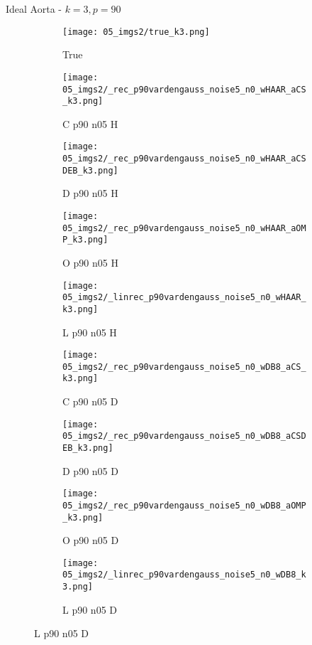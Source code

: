\begin{frame}{Ideal Aorta - $k=3,p=90$}{}
\begin{figure}
\begin{subfigure}{0.1\textwidth}
\texttt{[image: 05\_imgs2/true\_k3.png]}
\caption*{\Tiny True}
\end{subfigure}
\begin{subfigure}{0.1\textwidth}
\texttt{[image: 05\_imgs2/\_rec\_p90vardengauss\_noise5\_n0\_wHAAR\_aCS\_k3.png]}
\caption*{\Tiny C p90 n05 H}
\end{subfigure}
\begin{subfigure}{0.1\textwidth}
\texttt{[image: 05\_imgs2/\_rec\_p90vardengauss\_noise5\_n0\_wHAAR\_aCSDEB\_k3.png]}
\caption*{\Tiny D p90 n05 H}
\end{subfigure}
\begin{subfigure}{0.1\textwidth}
\texttt{[image: 05\_imgs2/\_rec\_p90vardengauss\_noise5\_n0\_wHAAR\_aOMP\_k3.png]}
\caption*{\Tiny O p90 n05 H}
\end{subfigure}
\begin{subfigure}{0.1\textwidth}
\texttt{[image: 05\_imgs2/\_linrec\_p90vardengauss\_noise5\_n0\_wHAAR\_k3.png]}
\caption*{\Tiny L p90 n05 H}
\end{subfigure}
\begin{subfigure}{0.1\textwidth}
\texttt{[image: 05\_imgs2/\_rec\_p90vardengauss\_noise5\_n0\_wDB8\_aCS\_k3.png]}
\caption*{\Tiny C p90 n05 D}
\end{subfigure}
\begin{subfigure}{0.1\textwidth}
\texttt{[image: 05\_imgs2/\_rec\_p90vardengauss\_noise5\_n0\_wDB8\_aCSDEB\_k3.png]}
\caption*{\Tiny D p90 n05 D}
\end{subfigure}
\begin{subfigure}{0.1\textwidth}
\texttt{[image: 05\_imgs2/\_rec\_p90vardengauss\_noise5\_n0\_wDB8\_aOMP\_k3.png]}
\caption*{\Tiny O p90 n05 D}
\end{subfigure}
\begin{subfigure}{0.1\textwidth}
\texttt{[image: 05\_imgs2/\_linrec\_p90vardengauss\_noise5\_n0\_wDB8\_k3.png]}
\caption*{\Tiny L p90 n05 D}
\end{subfigure}

\vspace{5pt}


\end{figure}
\end{frame}
